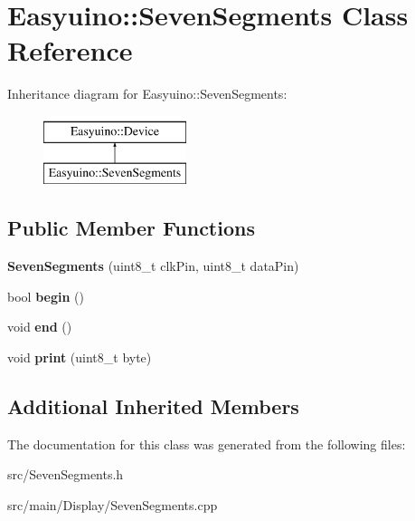 \hypertarget{class_easyuino_1_1_seven_segments}{}\section{Easyuino\+:\+:Seven\+Segments Class Reference}
\label{class_easyuino_1_1_seven_segments}
Inheritance diagram for Easyuino\+:\+:Seven\+Segments\+:\begin{figure}[H]
\begin{center}
\leavevmode
\includegraphics[height=2.000000cm]{class_easyuino_1_1_seven_segments}
\end{center}
\end{figure}
\subsection*{Public Member Functions}
\begin{DoxyCompactItemize}
\item 
\mbox{\label{class_easyuino_1_1_seven_segments_a4a892bc5fe3f8b27cc6b7efbd31e8012}} 
{\bfseries Seven\+Segments} (uint8\+\_\+t clk\+Pin, uint8\+\_\+t data\+Pin)
\item 
\mbox{\label{class_easyuino_1_1_seven_segments_ab59d5cbdc22567fb97854f32d899e02d}} 
bool {\bfseries begin} ()
\item 
\mbox{\label{class_easyuino_1_1_seven_segments_afea49385382a7b9c597b4fe42a003fee}} 
void {\bfseries end} ()
\item 
\mbox{\label{class_easyuino_1_1_seven_segments_a37d542d1ca55d2733c2f11c8efc79f0f}} 
void {\bfseries print} (uint8\+\_\+t byte)
\end{DoxyCompactItemize}
\subsection*{Additional Inherited Members}


The documentation for this class was generated from the following files\+:\begin{DoxyCompactItemize}
\item 
src/Seven\+Segments.\+h\item 
src/main/\+Display/Seven\+Segments.\+cpp\end{DoxyCompactItemize}
